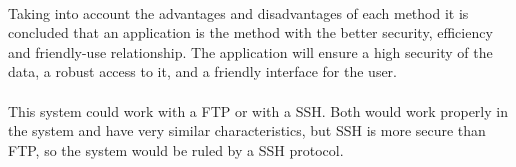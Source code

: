 \paragraph{}Taking into account the advantages and disadvantages of each method it is concluded that an application is the method with the better security, efficiency and friendly-use relationship. The application will ensure a high security of the data, a robust access to it, and a friendly interface for the user.
\paragraph{}This system could work with a FTP or with a SSH. Both would work properly in the system and have very similar characteristics, but SSH is more secure than FTP, so the system would be ruled by a SSH protocol.